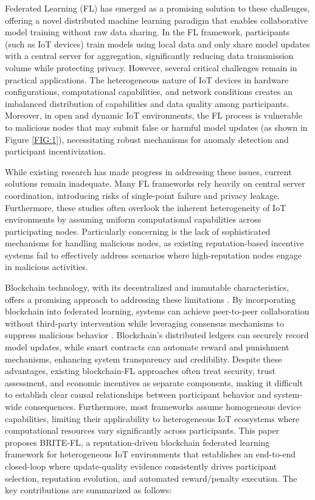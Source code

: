 \documentclass[a4paper]{cas-dc}
\begin{document}
Federated Learning (FL) has emerged as a promising solution to these challenges, offering a novel distributed machine learning paradigm that enables collaborative model training without raw data sharing\cite{18}. In the FL framework, participants (such as IoT devices) train models using local data and only share model updates with a central server for aggregation\cite{13}, significantly reducing data transmission volume while protecting privacy\cite{11}. However, several critical challenges remain in practical applications. The heterogeneous nature of IoT devices in hardware configurations, computational capabilities, and network conditions creates an imbalanced distribution of capabilities and data quality among participants\cite{14}. Moreover, in open and dynamic IoT environments, the FL process is vulnerable to malicious nodes that may submit false or harmful model updates (as shown in Figure \ref{FIG:1}), necessitating robust mechanisms for anomaly detection and participant incentivization\cite{15,16,17}.

While existing research has made progress in addressing these issues, current solutions remain inadequate\cite{18}. Many FL frameworks rely heavily on central server coordination, introducing risks of single-point failure and privacy leakage\cite{18,19,20}. Furthermore, these studies often overlook the inherent heterogeneity of IoT environments by assuming uniform computational capabilities across participating nodes\cite{21}. Particularly concerning is the lack of sophisticated mechanisms for handling malicious nodes, as existing reputation-based incentive systems fail to effectively address scenarios where high-reputation nodes engage in malicious activities\cite{22}.

Blockchain technology, with its decentralized and immutable characteristics, offers a promising approach to addressing these limitations \cite{23}. By incorporating blockchain into federated learning, systems can achieve peer-to-peer collaboration without third-party intervention while leveraging consensus mechanisms to suppress malicious behavior \cite{24}. Blockchain's distributed ledgers can securely record model updates, while smart contracts can automate reward and punishment mechanisms, enhancing system transparency and credibility\cite{25,26,27}. Despite these advantages, existing blockchain-FL approaches often treat security, trust assessment, and economic incentives as separate components, making it difficult to establish clear causal relationships between participant behavior and system-wide consequences. Furthermore, most frameworks assume homogeneous device capabilities, limiting their applicability to heterogeneous IoT ecosystems where computational resources vary significantly across participants.
This paper proposes BRITE-FL, a reputation-driven blockchain federated learning 
framework for heterogeneous IoT environments that establishes an end-to-end 
closed-loop where update-quality evidence consistently drives participant 
selection, reputation evolution, and automated reward/penalty execution. The 
key contributions are summarized as follows:
\end{document}

